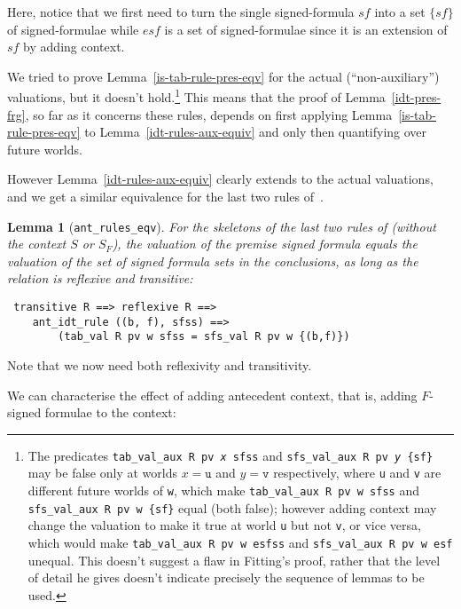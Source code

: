 \documentclass[a4paper]{article}
\newtheorem{lemma}{Lemma}
\begin{document}
Here, notice that we first need to turn the single signed-formula $sf$
into a set $\{sf\}$ of signed-formulae while $esf$ is a set of
signed-formulae since it is an extension of $sf$ by adding context.

We tried to prove Lemma~\ref{is-tab-rule-pres-eqv}
for the actual (``non-auxiliary'') valuations,
but it doesn't hold.\footnote{
The predicates \texttt{tab\_val\_aux R pv \textit{x} sfss} and 
\texttt{sfs\_val\_aux R pv \textit{y} \{sf\}} 
may be false only at worlds $x = \texttt{u}$ and $y = \texttt{v}$ 
respectively, where \texttt{u} and \texttt{v}
are different future worlds of \texttt{w},
which make
\texttt{tab\_val\_aux R pv w sfss} and \texttt{sfs\_val\_aux R pv w \{sf\}}
equal (both false);
however adding context may change the valuation to make it true
at world \texttt{u} but not \texttt{v}, or vice versa,
which would make 
\texttt{tab\_val\_aux R pv w esfss} and \texttt{sfs\_val\_aux R pv w esf}
unequal.
This doesn't suggest a flaw in Fitting's proof, rather that the level of detail
he gives doesn't indicate precisely the sequence of lemmas to be used.}
This means that the proof of Lemma~\ref{idt-pres-frg}, 
so far as it concerns these rules, depends on first applying 
Lemma~\ref{is-tab-rule-pres-eqv} to Lemma~\ref{idt-rules-aux-equiv}
and only then quantifying over future worlds.  

However Lemma~\ref{idt-rules-aux-equiv} clearly extends to the
actual valuations, and we get a similar equivalence
for the last two rules of~\cite[Figure~1.6]{fitting-dual-tableau}.

\begin{lemma}[\texttt{ant\_rules\_eqv}] \label{ant-rules-eqv} For the
  skeletons of the last two rules of \cite[Figure~1.6]{fitting-dual-tableau}
  (without the context $S$ or $S_F$),
  the valuation of the premise signed formula equals the
  valuation of the set of signed formula sets in the conclusions,
  as long as the relation is reflexive
  and transitive:
\end{lemma}
\begin{verbatim}
 transitive R ==> reflexive R ==> 
    ant_idt_rule ((b, f), sfss) ==>
        (tab_val R pv w sfss = sfs_val R pv w {(b,f)})
\end{verbatim}

Note that we now need both reflexivity and transitivity.

We can characterise the effect of adding antecedent context, that is,
adding $F$-signed formulae to the context:
\end{document}
